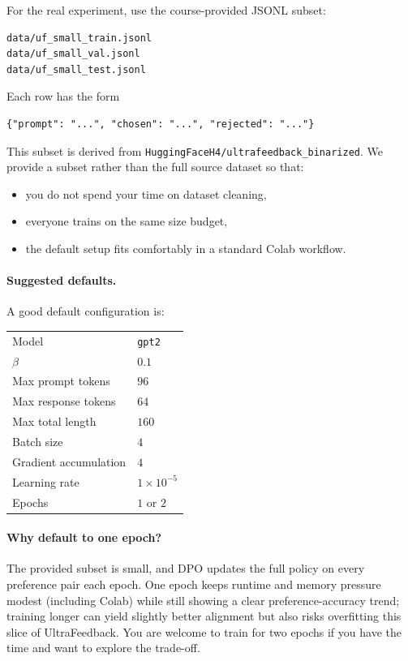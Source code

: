 \documentclass[11pt]{article}
\begin{document}
For the real experiment, use the course-provided JSONL subset:
\begin{lstlisting}
data/uf_small_train.jsonl
data/uf_small_val.jsonl
data/uf_small_test.jsonl
\end{lstlisting}

Each row has the form
\begin{lstlisting}
{"prompt": "...", "chosen": "...", "rejected": "..."}
\end{lstlisting}

This subset is derived from \texttt{HuggingFaceH4/ultrafeedback\_binarized}. We provide a subset rather than the full source dataset so that:
\begin{itemize}[itemsep=0.25em]
    \item you do not spend your time on dataset cleaning,
    \item everyone trains on the same size budget,
    \item the default setup fits comfortably in a standard Colab workflow.
\end{itemize}

\paragraph{Suggested defaults.}
A good default configuration is:
\begin{center}
\begin{tabular}{ll}
\toprule
Model & \texttt{gpt2} \\
\(\beta\) & \(0.1\) \\
Max prompt tokens & \(96\) \\
Max response tokens & \(64\) \\
Max total length & \(160\) \\
Batch size & \(4\) \\
Gradient accumulation & \(4\) \\
Learning rate & \(1\times 10^{-5}\) \\
Epochs & \(1\) or \(2\) \\
\bottomrule
\end{tabular}
\end{center}

\paragraph{Why default to one epoch?}
The provided subset is small, and DPO updates the full policy on every preference pair each epoch.
One epoch keeps runtime and memory pressure modest (including Colab) while still showing a clear preference-accuracy trend; training longer can yield slightly better alignment but also risks overfitting this slice of UltraFeedback.
You are welcome to train for two epochs if you have the time and want to explore the trade-off.
\end{document}
